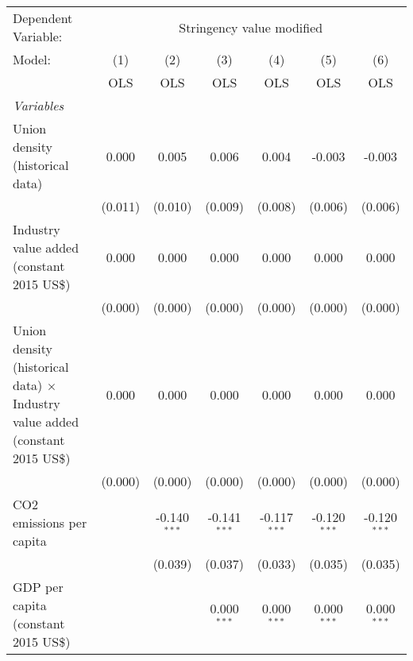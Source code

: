 
\begingroup
\centering
\begin{tabular}{lcccccc}
   \toprule
   Dependent Variable: & \multicolumn{6}{c}{Stringency value modified}\\
   Model:                                                                               & (1)     & (2)            & (3)            & (4)            & (5)            & (6)\\  
                                                                                        &  OLS    & OLS            & OLS            & OLS            & OLS            & OLS\\  
   \midrule
   \emph{Variables}\\
   Union density (historical data)                                                      & 0.000   & 0.005          & 0.006          & 0.004          & -0.003         & -0.003\\   
                                                                                        & (0.011) & (0.010)        & (0.009)        & (0.008)        & (0.006)        & (0.006)\\   
   Industry value added (constant 2015 US\$)                                            & 0.000   & 0.000          & 0.000          & 0.000          & 0.000          & 0.000\\   
                                                                                        & (0.000) & (0.000)        & (0.000)        & (0.000)        & (0.000)        & (0.000)\\   
   Union density (historical data) $\times$ Industry value added (constant 2015 US\$)   & 0.000   & 0.000          & 0.000          & 0.000          & 0.000          & 0.000\\   
                                                                                        & (0.000) & (0.000)        & (0.000)        & (0.000)        & (0.000)        & (0.000)\\   
   CO2 emissions per capita                                                             &         & -0.140$^{***}$ & -0.141$^{***}$ & -0.117$^{***}$ & -0.120$^{***}$ & -0.120$^{***}$\\   
                                                                                        &         & (0.039)        & (0.037)        & (0.033)        & (0.035)        & (0.035)\\   
   GDP per capita (constant 2015 US\$)                                                  &         &                & 0.000$^{***}$  & 0.000$^{***}$  & 0.000$^{***}$  & 0.000$^{***}$\\   

\end{tabular}
